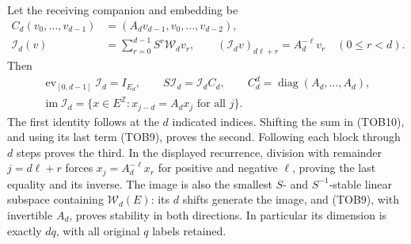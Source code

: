 Let the receiving companion and embedding be
\begin{equation}\tag{TOB10}
\begin{split}
 C_d(v_0,\ldots,v_{d-1})&=(A_dv_{d-1},v_0,\ldots,v_{d-2}),\\
 \mathcal I_d(v)&=\sum_{r=0}^{d-1}S^r\mathcal W_dv_r,
 \qquad (\mathcal I_dv)_{d\ell+r}=A_d^{-\ell}v_r
 \quad(0\le r<d).
\end{split}
\end{equation}
Then
\begin{equation}\tag{TOB11}
\begin{gathered}
 \operatorname{ev}_{[0,d-1]}\mathcal I_d=I_{E_d},\qquad
 S\mathcal I_d=\mathcal I_d C_d,\qquad
 C_d^d=\operatorname{diag}(A_d,\ldots,A_d),\\
 \operatorname{im}\mathcal I_d
 =\{x\in E^{\mathbb Z}:x_{j-d}=A_dx_j\text{ for all }j\}.
\end{gathered}
\end{equation}
The first identity follows at the $d$ indicated indices. Shifting
the sum in (TOB10), and using its last term (TOB9), proves the second.
Following each block through $d$ steps proves the third. In the
displayed recurrence, division with remainder $j=d\ell+r$ forces
$x_j=A_d^{-\ell}x_r$ for positive and negative $\ell$, proving the
last equality and its inverse. The image is also the smallest
$S$- and $S^{-1}$-stable linear subspace containing
$\mathcal W_d(E)$: its $d$ shifts generate the image, and
(TOB9), with invertible $A_d$, proves stability in both directions.
In particular its dimension is exactly $dq$, with all original
$q$ labels retained.

